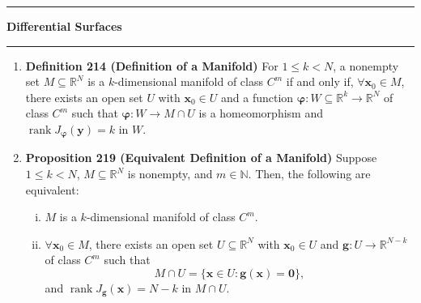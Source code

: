 \documentclass[11pt]{article}
\newcommand{\bvarphi}{\boldsymbol{\varphi}}
\newcommand{\rank}{\operatorname{rank}}
\newcommand{\bzero}{\mathbf{0}}
\newcommand{\bx}{\mathbf{x}}
\newcommand{\by}{\mathbf{y}}
\newcommand{\bfg}{\mathbf{g}}
\begin{document}
\hrule
{\Large \bf Differential Surfaces}
\vspace{1mm}
\hrule
\begin{enumerate}
\item \textbf{Definition 214 (Definition of a Manifold)}
For $1 \leq k < N$, a nonempty set $M \subseteq \mathbb{R}^N$ is a
$k$-dimensional manifold of class $C^m$ if and only if, $\forall \bx_0 \in M$,
there exists an open set $U$ with $\bx_0 \in U$ and a function
$\bvarphi: W \subseteq \mathbb{R}^k \rightarrow \mathbb{R}^N$ of class $C^m$
such that $\bvarphi: W \rightarrow M \cap U$ is a homeomorphism and
$\rank J_{\bvarphi}(\by) = k$ in $W$.

\item \textbf{Proposition 219 (Equivalent Definition of a Manifold)}
Suppose $1 \leq k < N$, $M \subseteq \mathbb{R}^N$ is nonempty, and
$m \in \mathbb{N}$. Then, the following are equivalent:
\begin{enumerate}[(i)]
\item $M$ is a $k$-dimensional manifold of class $C^m$.

\item $\forall \bx_0 \in M$, there exists an open set
$U \subseteq \mathbb{R}^N$ with $\bx_0 \in U$ and
$\bfg: U \rightarrow \mathbb{R}^{N - k}$ of class $C^m$ such that
\[M \cap U = \{\bx \in U : \bfg(\bx) = \bzero\},\] and
$\rank J_{\bfg}(\bx) = N - k$ in $M \cap U$.
\end{enumerate}


\end{enumerate}
\end{document}
